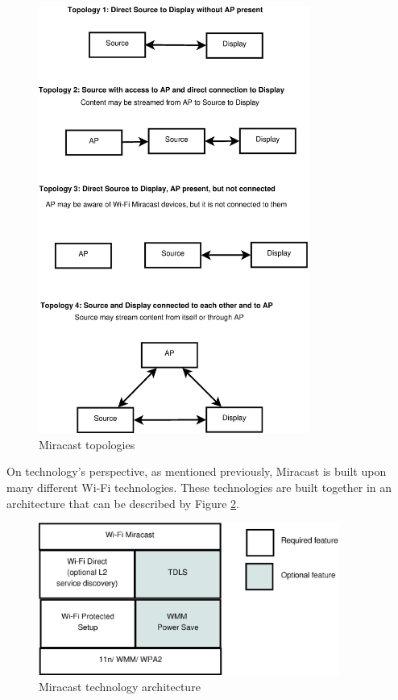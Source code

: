 \begin{figure}[htb] \centering 
\includegraphics[height=14cm]{charts/miracast_model} 
\caption{Miracast topologies \label{miracast_model}} 
\end{figure} 

On technology's perspective, as mentioned previously, Miracast is built upon
many different Wi-Fi technologies. These technologies are built together in an architecture that can be described by Figure \ref{miracast_architect}. \\

\begin{figure}[htb] \centering 
\includegraphics[height=5cm]{charts/miracast_technology_architecture} 
\caption{Miracast technology architecture \label{miracast_architect}} 
\end{figure} 

